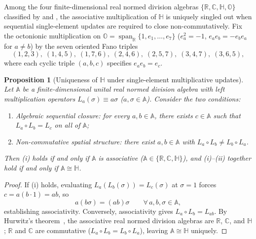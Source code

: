 \documentclass[aps,prd,onecolumn,tightenlines,nofootinbib,notitlepage,11pt,floatfix]{revtex4-2}
\theoremstyle{indentedtheorem}
\newtheorem{proposition}{Proposition}
\begin{document}
Among the four finite-dimensional real normed division algebras $\{\mathbb{R},\mathbb{C},\mathbb{H},\mathbb{O}\}$ classified by \citet{Hurwitz1898Composition} and \citet{Baez2002Octonions}, the associative multiplication of $\mathbb{H}$ is uniquely singled out when sequential single-element updates are required to close non-commutatively. Fix the octonionic multiplication on $\mathbb{O}=\operatorname{span}_{\mathbb{R}}\{1,e_1,\dots,e_7\}$ ($e_a^2=-1$, $e_a e_b = -e_b e_a$ for $a\neq b$) by the seven oriented Fano triples
\begin{equation}
    (1,2,3),\;(1,4,5),\;(1,7,6),\;(2,4,6),\;(2,5,7),\;(3,4,7),\;(3,6,5) ,
    \label{eq:fano_triples}
\end{equation}
where each cyclic triple $(a,b,c)$ specifies $e_a e_b = e_c$.

\begin{proposition}[Uniqueness of $\mathbb{H}$ under single-element multiplicative updates]
\label{prop:quat_uniqueness}
Let $\mathbb{A}$ be a finite-dimensional unital real normed division algebra with left multiplication operators $L_a(\sigma)\equiv a\sigma$ ($a,\sigma\in\mathbb{A}$). Consider the two conditions:
\begin{enumerate}[label=(\roman*)]
\item \emph{Algebraic sequential closure:} for every $a,b\in\mathbb{A}$, there exists $c\in\mathbb{A}$ such that $L_a\circ L_b = L_c$ on all of $\mathbb{A}$;
\item \emph{Non-commutative spatial structure:} there exist $a,b\in\mathbb{A}$ with $L_a\circ L_b \neq L_b\circ L_a$.
\end{enumerate}
Then (i) holds if and only if $\mathbb{A}$ is associative ($\mathbb{A}\in\{\mathbb{R},\mathbb{C},\mathbb{H}\}$), and (i)--(ii) together hold if and only if $\mathbb{A}\cong\mathbb{H}$.
\end{proposition}
\begin{proof}
If (i) holds, evaluating $L_a(L_b(\sigma))=L_c(\sigma)$ at $\sigma=1$ forces $c = a(b\cdot 1)=ab$, so
\begin{equation}
    a(b\sigma) = (ab)\sigma \qquad \forall\, a,b,\sigma\in\mathbb{A} ,
    \label{eq:single_elem_assoc}
\end{equation}
establishing associativity. Conversely, associativity gives $L_a\circ L_b = L_{ab}$. By Hurwitz's theorem~\citep{Hurwitz1898Composition,Baez2002Octonions}, the associative real normed division algebras are $\mathbb{R}$, $\mathbb{C}$, and $\mathbb{H}$; $\mathbb{R}$ and $\mathbb{C}$ are commutative ($L_a\circ L_b = L_b\circ L_a$), leaving $\mathbb{A}\cong\mathbb{H}$ uniquely.
\end{proof}
\end{document}
